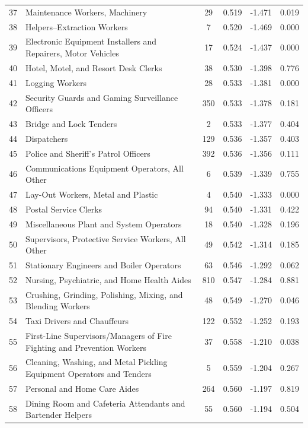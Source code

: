 {\begin{longtable}{llcccc}
 37 & Maintenance Workers, Machinery & 29 & 0.519 & -1.471 & 0.019 \\
 38 & Helpers--Extraction Workers & 7 & 0.520 & -1.469 & 0.000 \\
 39 & Electronic Equipment Installers and Repairers, Motor Vehicles & 17 & 0.524 & -1.437 & 0.000 \\
 40 & Hotel, Motel, and Resort Desk Clerks & 38 & 0.530 & -1.398 & 0.776 \\
 41 & Logging Workers & 28 & 0.533 & -1.381 & 0.000 \\
 42 & Security Guards and Gaming Surveillance Officers  & 350 & 0.533 & -1.378 & 0.181 \\
 43 & Bridge and Lock Tenders & 2 & 0.533 & -1.377 & 0.404 \\
 44 & Dispatchers & 129 & 0.536 & -1.357 & 0.403 \\
 45 & Police and Sheriff's Patrol Officers & 392 & 0.536 & -1.356 & 0.111 \\
 46 & Communications Equipment Operators, All Other & 6 & 0.539 & -1.339 & 0.755 \\
 47 & Lay-Out Workers, Metal and Plastic & 4 & 0.540 & -1.333 & 0.000 \\
 48 & Postal Service Clerks & 94 & 0.540 & -1.331 & 0.422 \\
 49 & Miscellaneous Plant and System Operators & 18 & 0.540 & -1.328 & 0.196 \\
 50 & Supervisors, Protective Service Workers, All Other & 49 & 0.542 & -1.314 & 0.185 \\
 51 & Stationary Engineers and Boiler Operators & 63 & 0.546 & -1.292 & 0.062 \\
 52 & Nursing, Psychiatric, and Home Health Aides & 810 & 0.547 & -1.284 & 0.881 \\
 53 & Crushing, Grinding, Polishing, Mixing, and Blending Workers  & 48 & 0.549 & -1.270 & 0.046 \\
 54 & Taxi Drivers and Chauffeurs & 122 & 0.552 & -1.252 & 0.193 \\
 55 & First-Line Supervisors/Managers of Fire Fighting and Prevention Workers & 37 & 0.558 & -1.210 & 0.038 \\
 56 & Cleaning, Washing, and Metal Pickling Equipment Operators and Tenders & 5 & 0.559 & -1.204 & 0.267 \\
 57 & Personal and Home Care Aides & 264 & 0.560 & -1.197 & 0.819 \\
 58 & Dining Room and Cafeteria Attendants and Bartender Helpers & 55 & 0.560 & -1.194 & 0.504 \\

\end{longtable}}
